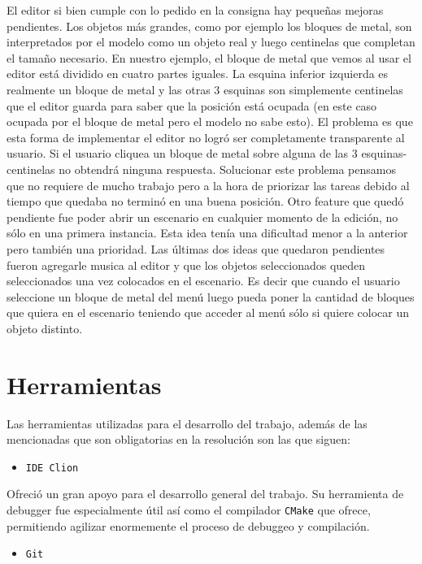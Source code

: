 \documentclass[a4paper]{article}
\begin{document}
El editor si bien cumple con lo pedido en la consigna hay pequeñas mejoras pendientes. Los objetos más grandes, como por ejemplo los bloques de metal, son interpretados por el modelo como un objeto real y luego centinelas que completan el tamaño necesario. En nuestro ejemplo, el bloque de metal que vemos al usar el editor está dividido en cuatro partes iguales. La esquina inferior izquierda es realmente un bloque de metal y las otras 3 esquinas son simplemente centinelas que el editor guarda para saber que la posición está ocupada (en este caso ocupada por el bloque de metal pero el modelo no sabe esto). El problema es que esta forma de implementar el editor no logró ser completamente transparente al usuario. Si el usuario cliquea un bloque de metal sobre alguna de las 3 esquinas-centinelas no obtendrá ninguna respuesta. Solucionar este problema pensamos que no requiere de mucho trabajo pero a la hora de priorizar las tareas debido al tiempo que quedaba no terminó en una buena posición. 
Otro feature que quedó pendiente fue poder abrir un escenario en cualquier momento de la edición, no sólo en una primera instancia. Esta idea tenía una dificultad menor a la anterior pero también una prioridad.
Las últimas dos ideas que quedaron pendientes fueron agregarle musica al editor y que los objetos seleccionados queden seleccionados una vez colocados en el escenario. Es decir que cuando el usuario seleccione un bloque de metal del menú luego pueda poner la cantidad de bloques que quiera en el escenario teniendo que acceder al menú sólo si quiere colocar un objeto distinto.

\section{Herramientas}

Las herramientas utilizadas para el desarrollo del trabajo, además de las mencionadas que son obligatorias en la resolución son las que siguen:

\begin{itemize}
	\item \texttt{IDE Clion}
\end{itemize}

Ofreció un gran apoyo para el desarrollo general del trabajo. Su herramienta de debugger fue especialmente útil así como el compilador \texttt{CMake} que ofrece, permitiendo agilizar enormemente el proceso de debuggeo y compilación.

\begin{itemize}
	\item \texttt{Git}
\end{itemize}
\end{document}
